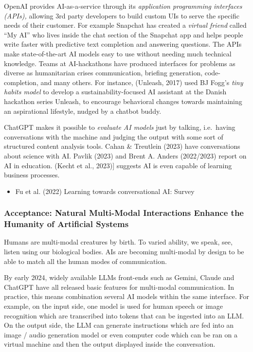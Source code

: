 \documentclass[
  letterpaper,
  DIV=11,
  numbers=noendperiod]{scrartcl}
\providecommand{\tightlist}{%
  \setlength{\itemsep}{0pt}\setlength{\parskip}{0pt}}\usepackage{longtable,booktabs,array}
\begin{document}
OpenAI provides AI-as-a-service through its \emph{application
programming interfaces (APIs),} allowing 3rd party developers to build
custom UIs to serve the specific needs of their customer. For example
Snapchat has created a \emph{virtual friend} called ``My AI'' who lives
inside the chat section of the Snapchat app and helps people write
faster with predictive text completion and answering questions. The APIs
make state-of-the-art AI models easy to use without needing much
technical knowledge. Teams at AI-hackathons have produced interfaces for
problems as diverse as humanitarian crises communication, briefing
generation, code-completion, and many others. For instance, (Unleash,
2017) used BJ Fogg's \emph{tiny habits model} to develop a
sustainability-focused AI assistant at the Danish hackathon series
Unleash, to encourage behavioral changes towards maintaining an
aspirational lifestyle, nudged by a chatbot buddy.

ChatGPT makes it possible to \emph{evaluate AI models} just by talking,
i.e.~having conversations with the machine and judging the output with
some sort of structured content analysis tools. Cahan \& Treutlein
(2023) have conversations about science with AI. Pavlik (2023) and Brent
A. Anders (2022/2023) report on AI in education. (Kecht et al., 2023){]}
suggests AI is even capable of learning business processes.

\begin{itemize}
\tightlist
\item
  Fu et al. (2022) Learning towards conversational AI: Survey
\end{itemize}

\subsubsection{\texorpdfstring{Acceptance: \textbf{Natural} Multi-Modal
\textbf{Interactions} Enhance the Humanity of Artificial
Systems}{Acceptance: Natural Multi-Modal Interactions Enhance the Humanity of Artificial Systems}}\label{acceptance-natural-multi-modal-interactions-enhance-the-humanity-of-artificial-systems}

Humans are multi-modal creatures by birth. To varied ability, we speak,
see, listen using our biological bodies. AIs are becoming multi-modal by
design to be able to match all the human modes of communication.

By early 2024, widely available LLMs front-ends such as Gemini, Claude
and ChatGPT have all released basic features for multi-modal
communication. In practice, this means combination several AI models
within the same interface. For example, on the input side, one model is
used for human speech or image recognition which are transcribed into
tokens that can be ingested into an LLM. On the output side, the LLM can
generate instructions which are fed into an image / audio generation
model or even computer code which can be ran on a virtual machine and
then the output displayed inside the conversation.
\end{document}
